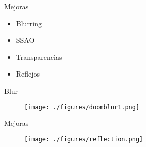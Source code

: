 \documentclass[table]{beamer}
\begin{document}
\begin{frame}[fragile]{Mejoras}
    \begin{itemize}
        \item Blurring
        \item SSAO
        \item Transparencias
        \item Reflejos
    \end{itemize}
\end{frame}

\begin{frame}[fragile]{Blur}
    \begin{figure}
        \texttt{[image: ./figures/doomblur1.png]}
    \end{figure}
\end{frame}


\begin{frame}[fragile]{Mejoras}
    \begin{figure}
        \texttt{[image: ./figures/reflection.png]}
    \end{figure}
\end{frame}

\begin{frame}
    \titlepage
\end{frame}
\end{document}
